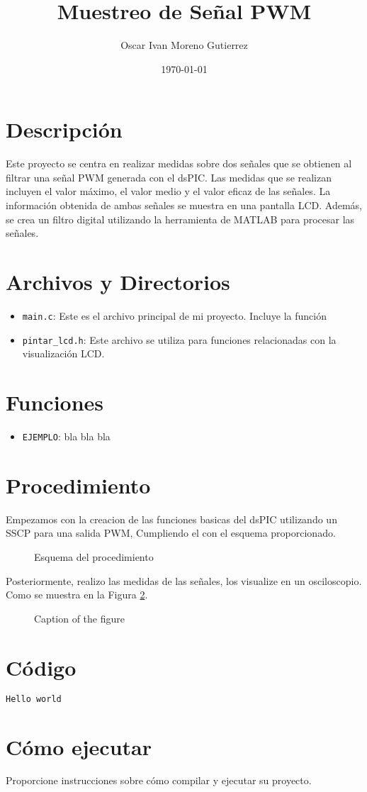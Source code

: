 \documentclass{article}
\title{Muestreo de Señal PWM}
\author{Oscar Ivan Moreno Gutierrez}
\date{\today}
\begin{document}
\maketitle

\section{Descripción}
Este proyecto se centra en realizar medidas sobre dos señales que se obtienen al filtrar una señal PWM generada con el dsPIC. Las medidas que se realizan incluyen el valor máximo, el valor medio y el valor eficaz de las señales. La información obtenida de ambas señales se muestra en una pantalla LCD. Además, se crea un filtro digital utilizando la herramienta de MATLAB para procesar las señales.
\section{Archivos y Directorios}
\begin{itemize}
\item \texttt{main.c}: Este es el archivo principal de mi proyecto. Incluye la función 
\item \texttt{pintar\_lcd.h}: Este archivo se utiliza para funciones relacionadas con la visualización LCD.
\end{itemize}

\section{Funciones}
\begin{itemize}
\item \texttt{EJEMPLO}: bla bla bla
\end{itemize}

\section{Procedimiento}
Empezamos con la creacion de las funciones basicas del dsPIC utilizando un SSCP para una salida PWM, Cumpliendo el con el esquema proporcionado.

\begin{figure}[htbp]
    \centering
    \caption{Esquema del procedimiento}
    \label{fig:esquema}
\end{figure}

Posteriormente, realizo las medidas de las señales, los visualize en un osciloscopio. Como se muestra en la Figura \ref{fig:osciloscopio}.
\begin{figure}[htbp]
    \centering
    \caption{Caption of the figure}
    \label{fig:osciloscopio}
\end{figure}

\section{Código}
\begin{lstlisting}[language=C]
    Hello world
\end{lstlisting}

\section{Cómo ejecutar}
Proporcione instrucciones sobre cómo compilar y ejecutar su proyecto.
\end{document}
